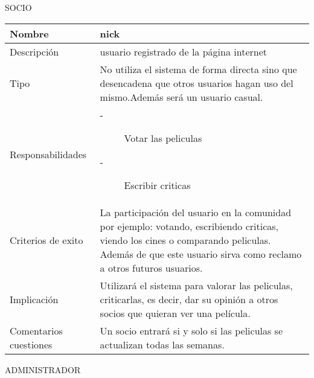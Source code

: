 \documentclass{article}
\begin{document}
SOCIO
\begin{table}[H]
    \begin{tabular}{||p{4cm} | p{7cm} ||}
    \hline
    \hline
    Nombre & nick \\
    \hline
    Descripción & usuario registrado  de la página internet\\
    \hline
    Tipo & No utiliza el sistema de forma directa sino que desencadena que otros usuarios hagan uso del mismo.Además será un usuario casual. \\
    \hline
    Responsabilidades &
        \begin{description}
        \item[-]Votar las peliculas 
        \item[-]Escribir criticas 
        \end{description}\\
    \hline
    Criterios de exito & La participación del usuario en la comunidad por ejemplo: votando, escribiendo criticas, viendo los cines o comparando peliculas. Además de que este usuario sirva como reclamo a otros futuros usuarios. \\
    \hline
    Implicación & Utilizará el sistema para valorar las peliculas, criticarlas, es decir, dar su opinión a otros socios que quieran ver una película. \\
    \hline
    Comentarios cuestiones & Un socio entrará si y solo si las peliculas se actualizan todas las semanas. \\
    \hline
    \hline
    \end{tabular}
\end{table}
\vspace{0.845cm}
ADMINISTRADOR
\end{document}
